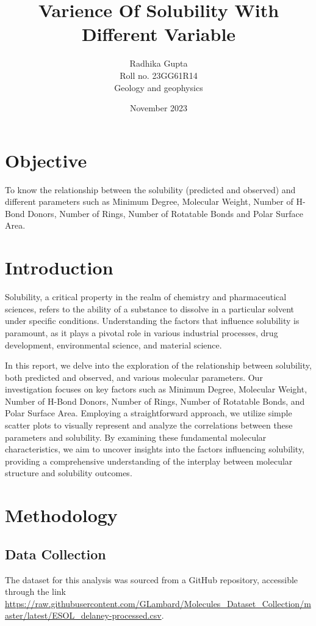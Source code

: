 \documentclass[20pt]{article}
\title{Varience Of Solubility With Different Variable}
\author{Radhika Gupta\\Roll no. 23GG61R14\\Geology and geophysics}
\date{November 2023}
\begin{document}
\maketitle

\section{Objective}
To know the relationship between the solubility (predicted and observed) and different parameters such as Minimum Degree,	Molecular Weight, Number of H-Bond Donors, Number of Rings, Number of Rotatable Bonds and Polar Surface Area.
\section{Introduction}
Solubility, a critical property in the realm of chemistry and pharmaceutical sciences, refers to the ability of a substance to dissolve in a particular solvent under specific conditions. Understanding the factors that influence solubility is paramount, as it plays a pivotal role in various industrial processes, drug development, environmental science, and material science.

In this report, we delve into the exploration of the relationship between solubility, both predicted and observed, and various molecular parameters. Our investigation focuses on key factors such as Minimum Degree, Molecular Weight, Number of H-Bond Donors, Number of Rings, Number of Rotatable Bonds, and Polar Surface Area. Employing a straightforward approach, we utilize simple scatter plots to visually represent and analyze the correlations between these parameters and solubility. By examining these fundamental molecular characteristics, we aim to uncover insights into the factors influencing solubility, providing a comprehensive understanding of the interplay between molecular structure and solubility outcomes.

\section{Methodology}
\subsection*{Data Collection}

The dataset for this analysis was sourced from a GitHub repository, accessible through the link \url{https://raw.githubusercontent.com/GLambard/Molecules_Dataset_Collection/master/latest/ESOL_delaney-processed.csv}.
\end{document}
